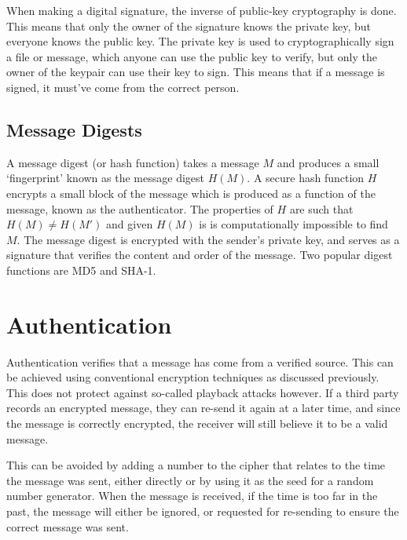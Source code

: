 When making a digital signature, the inverse of public-key cryptography is done. This means that only the owner of the
 signature knows the private key, but everyone knows the public key. The private key is used to cryptographically sign
 a file or message, which anyone can use the public key to verify, but only the owner of the keypair can use their key
 to sign. This means that if a message is signed, it must've come from the correct person.

\subsection*{Message Digests}

A message digest (or hash function) takes a message $M$ and produces a small `fingerprint' known as the message digest
 $H(M)$. A secure hash function $H$ encrypts a small block of the message which is produced as a function of the message,
 known as the authenticator. The properties of $H$ are such that $H(M) \neq H(M')$ and given $H(M)$ is is computationally
 impossible to find $M$. The message digest is encrypted with the sender's private key, and serves as a signature that
 verifies the content and order of the message. Two popular digest functions are MD5 and SHA-1.

\section*{Authentication}

Authentication verifies that a message has come from a verified source. This can be achieved using conventional encryption
 techniques as discussed previously. This does not protect against so-called playback attacks however. If a third party
 records an encrypted message, they can re-send it again at a later time, and since the message is correctly encrypted,
 the receiver will still believe it to be a valid message.

This can be avoided by adding a number to the cipher that relates to the time the message was sent, either directly or
 by using it as the seed for a random number generator. When the message is received, if the time is too far in the
 past, the message will either be ignored, or requested for re-sending to ensure the correct message was sent.